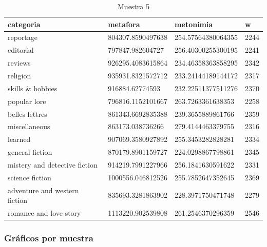 \documentclass[twoside]{article}
\begin{document}
\begin{center}
\begin{longtable}{| p{} | p{} | p{}|p{}|}
\caption{Muestra 5}
    \hline
        categoria & metafora & metonimia & w \\ \hline
        reportage & 804307.8590497638 & 254.57564380064355 & 2244 \\ \hline
        editorial & 797847.982604727 & 256.40300255300195 & 2241 \\ \hline
        reviews & 926295.4083615864 & 234.46358363858295 & 2342 \\ \hline
        religion & 935931.8321572712 & 233.24144189144172 & 2317 \\ \hline
        skills \& hobbies & 916884.62774593 & 232.22511377511276 & 2370 \\ \hline
        popular lore & 796816.1152101667 & 263.7263361638353 & 2258 \\ \hline
        belles lettres & 861343.6692835388 & 239.3655889861766 & 2359 \\ \hline
        miscellaneous & 863173.038736266 & 279.4144463379755 & 2316 \\ \hline
        learned & 907069.3580927892 & 255.3453282828281 & 2334 \\ \hline
        general fiction & 870179.8901159727 & 224.0298867798861 & 2345 \\ \hline
        mistery and detective fiction & 914219.7991227966 & 256.1841630591622 & 2331 \\ \hline
        science fiction & 1000556.046812526 & 255.7852647352645 & 2369 \\ \hline
        adventure and western fiction & 835693.3281863902 & 228.3971750471748 & 2279 \\ \hline
        romance and love story & 1113220.902539808 & 261.2546370296359 & 2546 \\ \hline
\end{longtable}
    \label{muestra5}
\end{center}
\subsubsection{Gráficos por muestra}
\label{sec:org27d6ba5}
\end{document}
